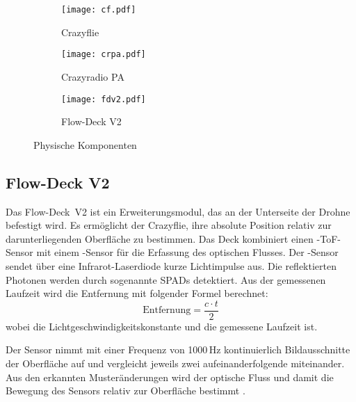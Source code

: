 \begin{figure}[H]
    \centering
    \begin{imgbox}
        \begin{subfigure}[b]{0.3\textwidth}
            \centering
            \texttt{[image: cf.pdf]}
            \caption{Crazyflie  \cite{bc:cf20}}
            \label{pic:cf20}
        \end{subfigure}
        \hfill
        \begin{subfigure}[b]{0.3\textwidth}
            \centering
            \texttt{[image: crpa.pdf]}
            \caption{Crazyradio PA \cite{bc:crpa}}
            \label{pic:crpa}
        \end{subfigure}
        \hfill
        \begin{subfigure}[b]{0.3\textwidth}
            \centering
            \texttt{[image: fdv2.pdf]}
            \caption{Flow-Deck V2 \cite{bc:fdv2}}
            \label{pic:fdv2}
        \end{subfigure}
    \end{imgbox}
    \caption{Physische Komponenten}
        \label{fig:drohne_und_radio}
\end{figure}

\subsection{Flow-Deck V2}
\label{sub:v2}

Das Flow-Deck~V2 ist ein Erweiterungsmodul, das an der Unterseite der Drohne befestigt wird.
Es ermöglicht der Crazyflie, ihre absolute Position relativ zur darunterliegenden Oberfläche zu bestimmen.
Das Deck kombiniert einen -ToF-Sensor\footnotemark{} mit einem -Sensor für die Erfassung des optischen Flusses.
Der -Sensor sendet über eine Infrarot-Laserdiode kurze Lichtimpulse aus.
Die reflektierten Photonen werden durch sogenannte SPADs\footnotemark{} detektiert. 
Aus der gemessenen Laufzeit wird die Entfernung mit folgender Formel berechnet:
\[
\text{Entfernung} = \frac{c \cdot t}{2}
\]
wobei  die Lichtgeschwindigkeitskonstante und  die gemessene Laufzeit ist.

Der  Sensor nimmt mit einer Frequenz von 1000\,Hz kontinuierlich Bildausschnitte der Oberfläche auf und vergleicht jeweils zwei aufeinanderfolgende miteinander.
Aus den erkannten Musteränderungen wird der optische Fluss und damit die Bewegung des Sensors relativ zur Oberfläche bestimmt \cite{bc:fdv2_specs}.

